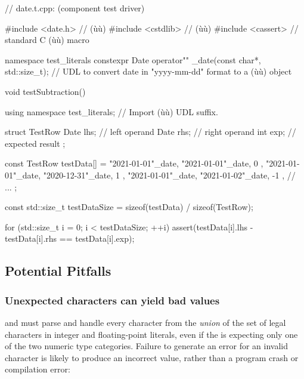 \begin{emcppslisting}[emcppsbatch=e21]
// date.t.cpp: (component test driver)

#include <date.h>   // (ù{}ù)
#include <cstdlib>  // (ù{}ù)
#include <cassert>  // standard C (ù{}ù) macro

namespace test_literals
{
    constexpr Date operator"" _date(const char*, std::size_t);
        // UDL to convert date in "yyyy-mm-dd" format to a (ù{}ù) object
}

void testSubtraction()
{
    using namespace test_literals;  // Import (ù{}ù) UDL suffix.

    struct TestRow
    {
        Date lhs;  // left operand
        Date rhs;  // right operand
        int  exp;  // expected result
    };

    const TestRow testData[] =
    {
        { "2021-01-01"_date, "2021-01-01"_date,  0 },
        { "2021-01-01"_date, "2020-12-31"_date,  1 },
        { "2021-01-01"_date, "2021-01-02"_date, -1 },
        // ...
    };

    const std::size_t testDataSize = sizeof(testData) / sizeof(TestRow);

    for (std::size_t i = 0; i < testDataSize; ++i)
    {
        assert(testData[i].lhs - testData[i].rhs == testData[i].exp);
    }
}
\end{emcppslisting}


\subsection[Potential Pitfalls]{Potential Pitfalls}\label{potential-pitfalls-defmemberinit}

\subsubsection[Unexpected characters can yield bad values]{Unexpected characters can yield bad values}\label{unexpected-characters-can-yield-bad-values}

 and  must
parse and handle every character from the \emph{union} of the set of
legal characters in integer and floating-point literals, even if the
 is expecting only one of the two numeric type
categories. Failure to generate an error for an invalid character is
likely to produce an incorrect value, rather than a program crash or
compilation error:

